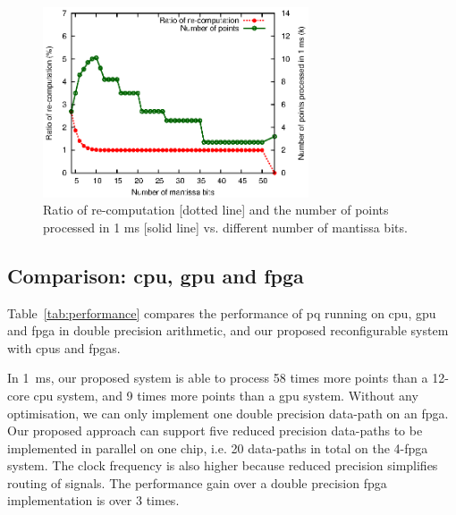 \begin{figure}[ht]
\begin{center}
\includegraphics[width=0.7\textwidth]{mixed_precision/figures/fig_recompute}
\end{center}
\caption{Ratio of re-computation [dotted line] and 
the number of points processed in 1 ms [solid line] 
vs. different number of mantissa bits.}
\label{fig:recompute}
\end{figure}

\subsection{Comparison: \gls{cpu}, \gls{gpu} and \gls{fpga}}
Table~\ref{tab:performance} compares the performance of \gls{pq} running on \gls{cpu}, \gls{gpu} and \gls{fpga} in double precision arithmetic, 
and our proposed reconfigurable system with \gls{cpu}s and \gls{fpga}s.


In 1~ms, our proposed system is able to process 58 times more points than a 12-core \gls{cpu} system, and 9 times more points than a \gls{gpu} system.
Without any optimisation, we can only implement one double precision data-path on an \gls{fpga}.
Our proposed approach can support five reduced precision data-paths to be implemented in parallel on one chip, i.e. 20 data-paths in total on the 4-\gls{fpga} system.
The clock frequency is also higher because reduced precision simplifies routing of signals.
The performance gain over a double precision \gls{fpga} implementation is over 3 times.

